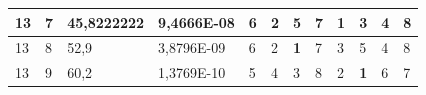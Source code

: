 \documentclass[conference]{IEEEtran}
\begin{document}
\begin{table}[]
\begin{tabular}{|llll|llllllll|}
\multicolumn{1}{|l|}{13}                                                    & \multicolumn{1}{l|}{7}                                                        & \multicolumn{1}{l|}{45,8222222}                                                   & 9,4666E-08                     & \multicolumn{1}{l|}{6}                                                  & \multicolumn{1}{l|}{2}                                                  & \multicolumn{1}{l|}{5}                                                  & \multicolumn{1}{l|}{7}                                                  & \multicolumn{1}{l|}{\textbf{1}}                                         & \multicolumn{1}{l|}{3}                                                  & \multicolumn{1}{l|}{4}                                                  & 8                          \\ \hline
\multicolumn{1}{|l|}{13}                                                    & \multicolumn{1}{l|}{8}                                                        & \multicolumn{1}{l|}{52,9}                                                         & 3,8796E-09                     & \multicolumn{1}{l|}{6}                                                  & \multicolumn{1}{l|}{2}                                                  & \multicolumn{1}{l|}{\textbf{1}}                                         & \multicolumn{1}{l|}{7}                                                  & \multicolumn{1}{l|}{3}                                                  & \multicolumn{1}{l|}{5}                                                  & \multicolumn{1}{l|}{4}                                                  & 8                          \\ \hline
\multicolumn{1}{|l|}{13}                                                    & \multicolumn{1}{l|}{9}                                                        & \multicolumn{1}{l|}{60,2}                                                         & 1,3769E-10                     & \multicolumn{1}{l|}{5}                                                  & \multicolumn{1}{l|}{4}                                                  & \multicolumn{1}{l|}{3}                                                  & \multicolumn{1}{l|}{8}                                                  & \multicolumn{1}{l|}{2}                                                  & \multicolumn{1}{l|}{\textbf{1}}                                         & \multicolumn{1}{l|}{6}                                                  & 7                          \\ \hline

\end{tabular}
\end{table}
\end{document}
